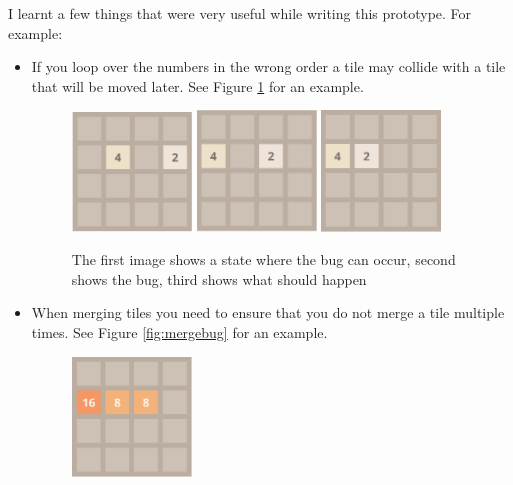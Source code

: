 \documentclass{article}
\begin{document}
I learnt a few things that were very useful while writing this prototype. For example: 
\begin{itemize}
    \item If you loop over the numbers in the wrong order a tile may collide with a tile that will be moved later. 
    See Figure \ref{fig:slidebug} for an example.
    \begin{figure}
        \centering
        \includegraphics[width=0.3\textwidth]{2048_slide.png}
        \includegraphics[width=0.3\textwidth]{2048_slide2.png}
        \includegraphics[width=0.3\textwidth]{2048_slide3.png}
        \caption{The first image shows a state where the bug can occur, second shows the bug, third shows what should happen}
        \label{fig:slidebug}
    \end{figure}
    \item When merging tiles you need to ensure that you do not merge a tile multiple times. See Figure \ref{fig:mergebug} for an example.
    \begin{figure}
        \centering
        \includegraphics[width=0.3\textwidth]{2048_merge.png}

\end{figure}
\end{itemize}
\end{document}
